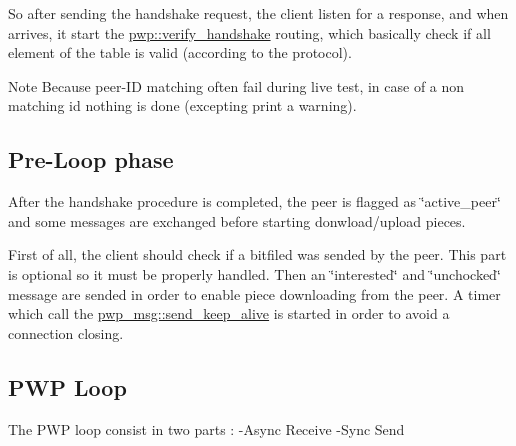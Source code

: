 So after sending the handshake request, the client listen for a response, and when arrives, it start the \hyperlink{namespacepwp_a58c780495f2139a56b95662dc7c0345f}{pwp\+::verify\+\_\+handshake} routing, which basically check if all element of the table is valid (according to the protocol).

\begin{DoxyNote}{Note}
Because peer-\/\+ID matching often fail during live test, in case of a non matching id nothing is done (excepting print a warning).
\end{DoxyNote}
\subsection*{Pre-\/\+Loop phase }

After the handshake procedure is completed, the peer is flagged as \char`\"{}active\+\_\+peer\char`\"{} and some messages are exchanged before starting donwload/upload pieces.

First of all, the client should check if a bitfiled was sended by the peer. This part is optional so it must be properly handled. Then an \char`\"{}interested\char`\"{} and \char`\"{}unchocked\char`\"{} message are sended in order to enable piece downloading from the peer. A timer which call the \hyperlink{namespacepwp__msg_a9a577f5a53b823d83bb4694f1ebf141e}{pwp\+\_\+msg\+::send\+\_\+keep\+\_\+alive} is started in order to avoid a connection closing.

\subsection*{P\+WP Loop }

The P\+WP loop consist in two parts \+: -\/\+Async Receive -\/\+Sync Send 